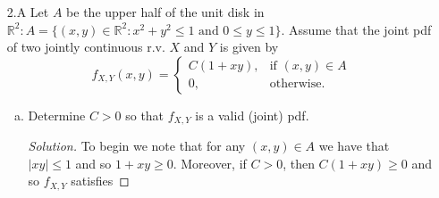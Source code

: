 \documentclass[12pt]{article}
\newenvironment{solution}
{\renewcommand\qedsymbol{$\blacksquare$}\begin{proof}[Solution]}
{\end{proof}}
\begin{document}
\begin{enumerate}
\begin{enumerate}[(a)]
\begin{solution}
                        pieces found in part (b). Letting $\mu_1=E[Y_1]$ and
                        $\mu_2=E[Y_2]$, which are both zero by part (b), then we have that  
                        \begin{align*}
                            Cov(Y_1, Y_2)&=E[(Y_1-\mu_1)(Y_2-\mu_2)] \\
                            &=E[Y_1\cdot Y_2] \\
                            &=E[(X_1-\overline{X})(X_2-\overline{X})] \\
                            &=E[X_1X_2-X_1\overline{X}-X_2\overline{X}+\overline{X}^2]
                            \\
                            &=E[X_1]E[X_2]-E[X_1\overline{X}]-E[X_2\overline{X}]+E[\overline{X}^2]
                            \\
                            &=\mu^2-2\bigg(\mu^2+\frac{\sigma^2}{n}\bigg)
                            +\frac{(n+2)\mu^2+\sigma^2}{n} \\
                            &=\frac{2\mu^2-\sigma^2}{n}. 
                        \end{align*}
                    \end{solution}
            \end{enumerate}
        \item[2.A] Let $A$ be the upper half of the unit disk in
            $\mathbb{R}^2:A=\{(x, y)\in\mathbb{R}^2:x^2+y^2\leq 1\text{ and
            }0\leq y\leq 1\}$. Assume that the joint pdf of two jointly
            continuous r.v. $X$ and $Y$ is given by 
            \begin{equation*}
                f_{X, Y}(x, y)=\begin{cases}
                    C(1+xy), &\text{if $(x, y)\in A$} \\
                    0, &\text{otherwise.}
                \end{cases}
            \end{equation*}
            \begin{enumerate}[(a)]
                \item Determine $C>0$ so that $f_{X, Y}$ is a valid (joint)
                    pdf. 
                    \begin{solution}
                        To begin we note that for any $(x, y)\in A$ we have
                        that $|xy|\leq 1$ and so $1+xy\geq 0$. Moreover, if
                        $C>0$, then $C(1+xy)\geq 0$ and so $f_{X, Y}$ satisfies

\end{solution}
\end{enumerate}
\end{enumerate}
\end{document}
